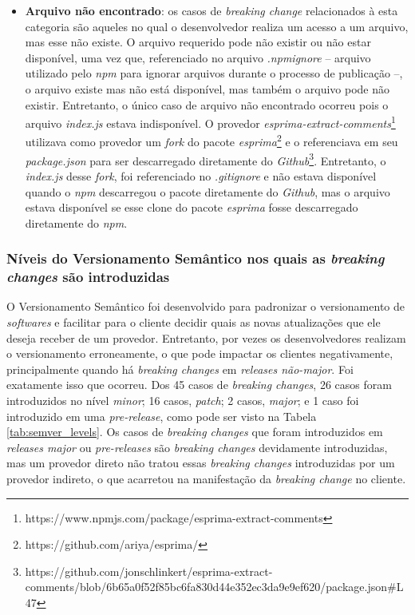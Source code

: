 \begin{itemize}
    \item \textbf{Arquivo não encontrado}: os casos de \textit{breaking change} relacionados à esta categoria são aqueles no qual o desenvolvedor realiza um acesso a um arquivo, mas esse não existe. O arquivo requerido pode não existir ou não estar disponível, uma vez que, referenciado no arquivo \textit{.npmignore} -- arquivo utilizado pelo \textit{npm} para ignorar arquivos durante o processo de publicação --, o arquivo existe mas não está disponível, mas também o arquivo pode não existir. Entretanto, o único caso de arquivo não encontrado ocorreu pois o arquivo \textit{index.js} estava indisponível. O provedor \textit{esprima-extract-comments}\footnote{https://www.npmjs.com/package/esprima-extract-comments} utilizava como provedor um \textit{fork} do pacote \textit{esprima}\footnote{https://github.com/ariya/esprima/} e o referenciava em seu  \textit{package.json} para ser descarregado diretamente do \textit{Github}\footnote{https://github.com/jonschlinkert/esprima-extract-comments/blob/6b65a0f52f85bc6fa830d44e352ec3da9e9ef620/package.json\#L47}. Entretanto, o \textit{index.js} desse \textit{fork}, foi referenciado no \textit{.gitignore} e não estava disponível quando o \textit{npm} descarregou o pacote diretamente do \textit{Github}, mas o arquivo estava disponível se esse clone do pacote \textit{esprima} fosse descarregado diretamente do \textit{npm}.

\end{itemize}{}

\subsubsection{Níveis do Versionamento Semântico nos quais as \textit{breaking changes} são introduzidas}
O Versionamento Semântico foi desenvolvido para padronizar o versionamento de \textit{softwares} e facilitar para o cliente decidir quais as novas atualizações que ele deseja receber de um provedor. Entretanto, por vezes os desenvolvedores realizam o versionamento erroneamente, o que pode impactar os clientes negativamente, principalmente quando há \textit{breaking changes} em \textit{releases não-major}. Foi exatamente isso que ocorreu. Dos 45 casos de \textit{breaking changes}, 26 casos foram introduzidos no nível \textit{minor}; 16 casos, \textit{patch}; 2 casos, \textit{major}; e 1 caso foi introduzido em uma \textit{pre-release}, como pode ser visto na Tabela \ref{tab:semver_levels}. Os casos de \textit{breaking changes} que foram introduzidos em \textit{releases major} ou \textit{pre-releases} são \textit{breaking changes} devidamente introduzidas, mas um provedor direto não tratou essas \textit{breaking changes} introduzidas por um provedor indireto, o que acarretou na manifestação da \textit{breaking change} no cliente.

